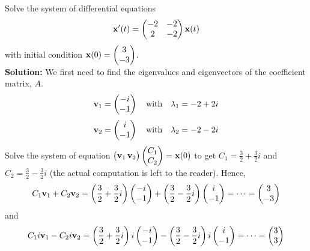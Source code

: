 \begin{example}\label{ex:linear_system_oscillation}
    Solve the system of differential equations 
    \[ {\bf x}'(t) = \begin{pmatrix} -2 & -2 \\ 2 & -2 \end{pmatrix} {\bf x}(t) \]
    with initial condition ${\bf x}(0) = \begin{pmatrix} 3 \\ -3 \end{pmatrix}$. \\
    {\bf Solution:} We first need to find the eigenvalues and eigenvectors of the
    coefficient matrix, $A$.  
    \[ {\bf v}_1 = \begin{pmatrix} -i \\ -1 \end{pmatrix} \quad \text{with} \quad \lambda_1 =
    -2 + 2i \]
    \[ {\bf v}_2 = \begin{pmatrix} i \\ -1 \end{pmatrix} \quad \text{with} \quad \lambda_2 =
    -2 - 2i \]
    Solve the system of equation $\begin{pmatrix} {\bf v}_1 \, {\bf v}_2 \end{pmatrix}
    \begin{pmatrix} C_1 \\ C_2 \end{pmatrix} = {\bf x}(0)$ to get $C_1 = \frac{3}{2} +
    \frac{3}{2} i$ and $C_2 = \frac{3}{2} - \frac{3}{2} i$ (the actual computation is left
    to the reader). 
    Hence,
    \[ C_1 {\bf v}_1 + C_2 {\bf v}_2 = \left( \frac{3}{2} + \frac{3}{2} i \right) \begin{pmatrix}
        -i \\ -1 \end{pmatrix} + \left( \frac{3}{2} - \frac{3}{2}i \right) \begin{pmatrix}
    i \\ -1 \end{pmatrix} = \cdots = \begin{pmatrix} 3 \\ -3 \end{pmatrix}  \]
    and
    \[ C_1i {\bf v}_1 - C_2i {\bf v}_2 = \left( \frac{3}{2} + \frac{3}{2} i \right)i \begin{pmatrix}
        -i \\ -1 \end{pmatrix} - \left( \frac{3}{2} - \frac{3}{2}i \right)i \begin{pmatrix}
    i \\ -1 \end{pmatrix} = \cdots = \begin{pmatrix} 3 \\ 3 \end{pmatrix}  \]

\end{example}
